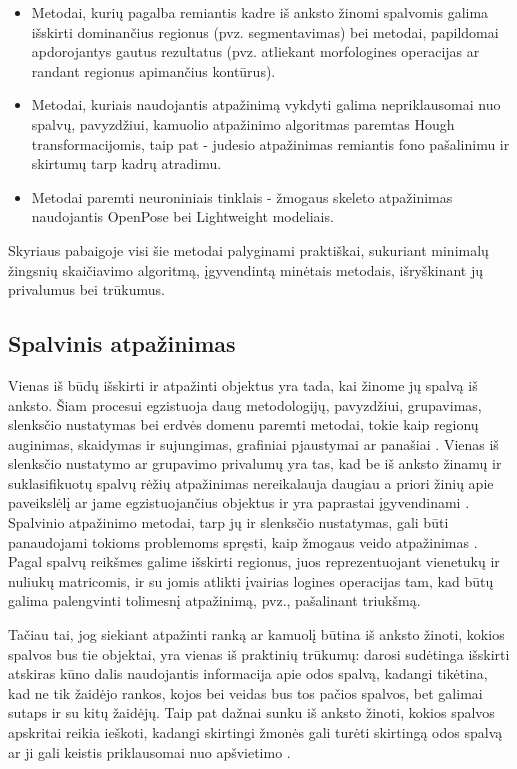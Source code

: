 \documentclass{VUMIFPSbakalaurinis}
\begin{document}
\begin{itemize}
	\item Metodai, kurių pagalba remiantis kadre iš anksto žinomi spalvomis galima išskirti dominančius regionus (pvz. segmentavimas) bei metodai, papildomai apdorojantys gautus rezultatus (pvz. atliekant morfologines operacijas ar randant regionus apimančius kontūrus).
	\item Metodai, kuriais naudojantis atpažinimą vykdyti galima nepriklausomai nuo spalvų, pavyzdžiui, kamuolio atpažinimo algoritmas paremtas Hough transformacijomis, taip pat - judesio atpažinimas remiantis fono pašalinimu ir skirtumų tarp kadrų atradimu.
	\item Metodai paremti neuroniniais tinklais - žmogaus skeleto atpažinimas naudojantis OpenPose bei Lightweight modeliais. 
\end{itemize}

Skyriaus pabaigoje visi šie metodai palyginami praktiškai, sukuriant minimalų žingsnių skaičiavimo algoritmą, įgyvendintą minėtais metodais, išryškinant jų privalumus bei trūkumus. 

\subsection{Spalvinis atpažinimas}
Vienas iš būdų išskirti ir atpažinti objektus yra tada, kai žinome jų spalvą iš anksto. Šiam procesui egzistuoja daug metodologijų, pavyzdžiui, grupavimas, slenksčio nustatymas bei erdvės domenu paremti metodai, tokie kaip regionų auginimas, skaidymas ir sujungimas, grafiniai pjaustymai ar panašiai \cite{segmentation_trends}. Vienas iš slenksčio nustatymo ar grupavimo privalumų yra tas, kad be iš anksto žinamų ir suklasifikuotų spalvų rėžių atpažinimas nereikalauja daugiau a priori žinių apie paveikslėlį ar jame egzistuojančius objektus ir yra paprastai įgyvendinami \cite{segmentation_trends}. Spalvinio atpažinimo metodai, tarp jų ir slenksčio nustatymas, gali būti panaudojami tokioms problemoms spręsti, kaip žmogaus veido atpažinimas \cite{WANG20011983}. Pagal spalvų reikšmes galime išskirti regionus, juos reprezentuojant vienetukų ir nuliukų matricomis, ir su jomis atlikti įvairias logines operacijas tam, kad būtų galima palengvinti tolimesnį atpažinimą, pvz., pašalinant triukšmą. 

Tačiau tai, jog siekiant atpažinti ranką ar kamuolį būtina iš anksto žinoti, kokios spalvos bus tie objektai, yra vienas iš praktinių trūkumų: darosi sudėtinga išskirti atskiras kūno dalis naudojantis informacija apie odos spalvą, kadangi tikėtina, kad ne tik žaidėjo rankos, kojos bei veidas bus tos pačios spalvos, bet galimai sutaps ir su kitų žaidėjų. Taip pat dažnai sunku iš anksto žinoti, kokios spalvos apskritai reikia ieškoti, kadangi skirtingi žmonės gali turėti skirtingą odos spalvą ar ji gali keistis priklausomai nuo apšvietimo \cite{KAKUMANU20071106}. 
\end{document}
